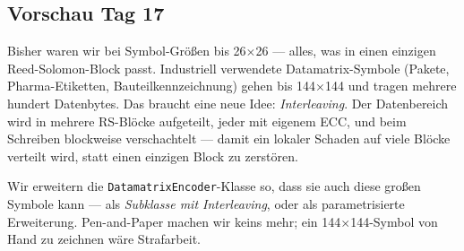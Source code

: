 \subsection*{Vorschau Tag 17}

Bisher waren wir bei Symbol-Größen bis 26$\times$26 — alles, was in
einen einzigen Reed-Solomon-Block passt. Industriell verwendete
Datamatrix-Symbole (Pakete, Pharma-Etiketten, Bauteilkennzeichnung)
gehen bis 144$\times$144 und tragen mehrere hundert Datenbytes. Das
braucht eine neue Idee: \emph{Interleaving}. Der Datenbereich wird
in mehrere RS-Blöcke aufgeteilt, jeder mit eigenem ECC, und beim
Schreiben blockweise verschachtelt — damit ein lokaler Schaden auf
viele Blöcke verteilt wird, statt einen einzigen Block zu zerstören.

Wir erweitern die \texttt{DatamatrixEncoder}-Klasse so, dass sie auch
diese großen Symbole kann — als \emph{Subklasse mit Interleaving},
oder als parametrisierte Erweiterung. Pen-and-Paper machen wir keins
mehr; ein 144$\times$144-Symbol von Hand zu zeichnen wäre Strafarbeit.
